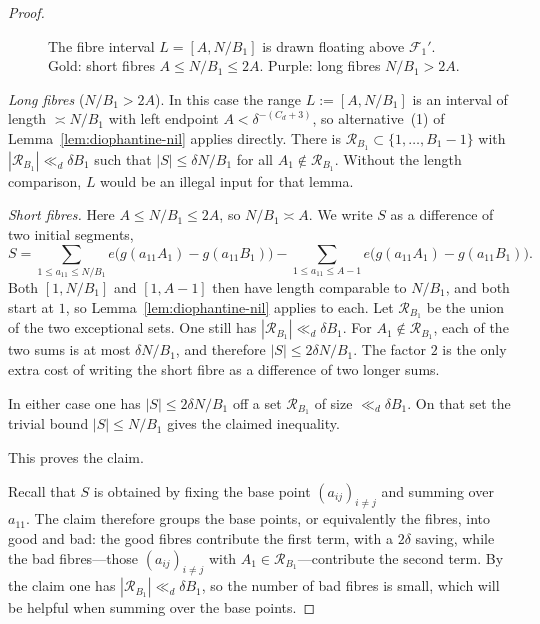 \begin{proof}
\begin{figure}[ht]
\caption{The fibre interval \(L=[A,N/B_1]\) is drawn floating above \(\mathscr{F}_1'\).
Gold: short fibres \(A\le N/B_1\le 2A\).
Purple: long fibres \(N/B_1>2A\).}
\label{fig:J1-longshort}
\end{figure}

\smallskip\noindent\emph{Long fibres} ($N/B_1>2A$).
In this case the range \(L:=[A,N/B_1]\) is an interval of length \(\asymp N/B_1\) with left endpoint \(A<\delta^{-(C_d+3)}\), so alternative~(1) of Lemma~\ref{lem:diophantine-nil} applies directly. There is \(\mathcal{R}_{B_1}\subset\{1,\ldots,B_1-1\}\) with \(|\mathcal{R}_{B_1}|\ll_d\delta B_1\) such that \(|S|\leq\delta N/B_1\) for all \(A_1\notin\mathcal{R}_{B_1}\).
Without the length comparison, \(L\) would be an illegal input for that lemma.

\smallskip\noindent\emph{Short fibres.}
Here $A\le N/B_1\le 2A$, so $N/B_1\asymp A$.
We write $S$ as a difference of two initial segments,
\[
S=\sum_{1\leq a_{11}\leq N/B_1} e\big(g(a_{11}A_1)-g(a_{11}B_1)\big)
-\sum_{1\leq a_{11}\leq A-1} e\big(g(a_{11}A_1)-g(a_{11}B_1)\big).
\]
Both \([1,N/B_1]\) and \([1,A-1]\) then have length comparable to \(N/B_1\), and both start at \(1\), so Lemma~\ref{lem:diophantine-nil} applies to each.
Let \(\mathcal{R}_{B_1}\) be the union of the two exceptional sets. One still has \(|\mathcal{R}_{B_1}|\ll_d\delta B_1\).
For \(A_1\notin\mathcal{R}_{B_1}\), each of the two sums is at most \(\delta N/B_1\), and therefore \(|S|\le 2\delta N/B_1\).
The factor $2$ is the only extra cost of writing the short fibre as a difference of two longer sums.

In either case one has $|S|\le 2\delta N/B_1$ off a set $\mathcal{R}_{B_1}$ of size $\ll_d\delta B_1$.  On that set the trivial bound $|S|\le N/B_1$ gives the claimed inequality.

This proves the claim.

\smallskip
Recall that $S$ is obtained by fixing the base point $(a_{ij})_{i\neq j}$ and summing over $a_{11}$.
The claim therefore groups the base points, or equivalently the fibres, into good and bad: the good fibres contribute the first term, with a $2\delta$ saving, while the bad fibres---those $(a_{ij})_{i\neq j}$ with $A_1\in\mathcal{R}_{B_1}$---contribute the second term.
By the claim one has $|\mathcal{R}_{B_1}|\ll_d\delta B_1$, so the number of bad fibres is small, which will be helpful when summing over the base points.


\end{proof}
